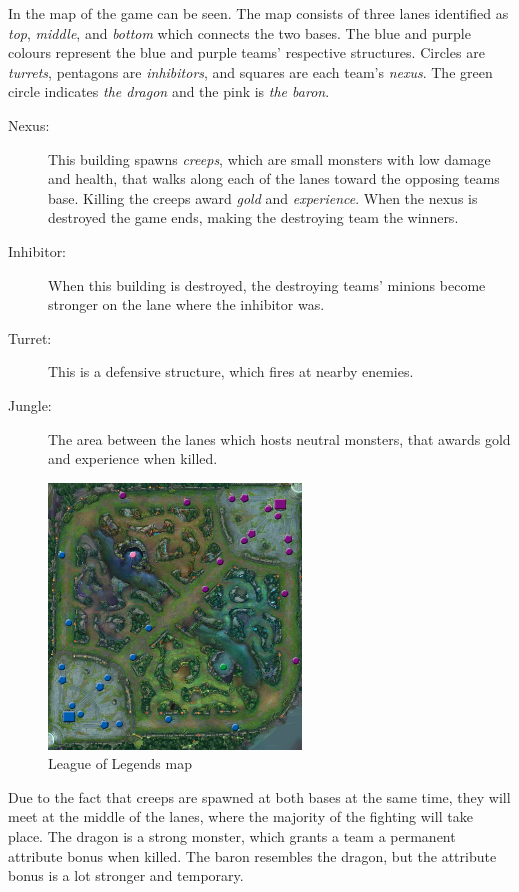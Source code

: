 In  the map of the game can be seen. The map consists of three lanes identified as \emph{top}, \emph{middle}, and \emph{bottom} which connects the two bases. The blue and purple colours represent the blue and purple teams' respective structures. Circles are \emph{turrets}, pentagons are \emph{inhibitors}, and squares are each team's \emph{nexus}. The green circle indicates \emph{the dragon} and the pink is \emph{the baron}.

\begin{description}
\item[Nexus:] This building spawns \emph{creeps}, which are small monsters with low damage and health, that walks along each of the lanes toward the opposing teams base. Killing the creeps award \emph{gold} and \emph{experience}. When the nexus is destroyed the game ends, making the destroying team the winners.
\item[Inhibitor:] When this building is destroyed, the destroying teams' minions become stronger on the lane where the inhibitor was.
\item[Turret:] This is a defensive structure, which fires at nearby enemies.
\item[Jungle:] The area between the lanes which hosts neutral monsters, that awards gold and experience when killed.
\end{description}

\begin{figure}[!htb]
  \centering
    \includegraphics[width=0.6\textwidth]{img/lolmap.jpg}
  \caption{League of Legends map~\cite{lolmap}}\label{fig:lolmap}
\end{figure}

Due to the fact that creeps are spawned at both bases at the same time, they will meet at the middle of the lanes, where the majority of the fighting will take place. The dragon is a strong monster, which grants a team a permanent attribute bonus when killed. The baron resembles the dragon, but the attribute bonus is a lot stronger and temporary.

